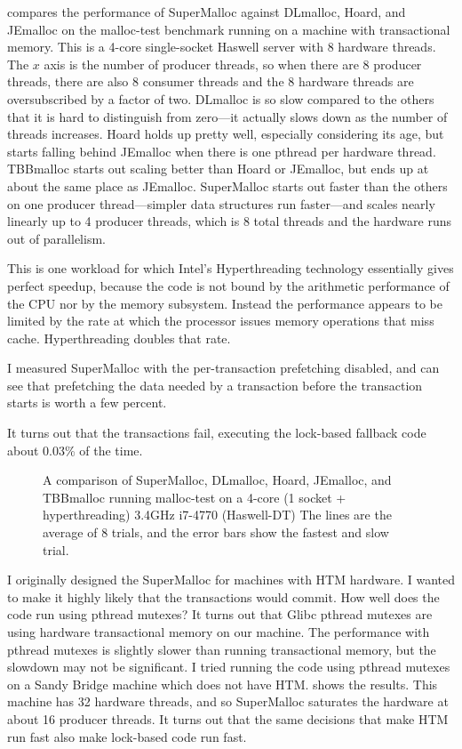 \documentclass[natbib,sort&compress,10pt]{sigplanconf}
\begin{document}
 compares the performance of SuperMalloc against
DLmalloc, Hoard, and JEmalloc on the malloc-test benchmark running on
a machine with transactional memory.  This is a 4-core single-socket
Haswell server with 8 hardware threads.  The $x$ axis is the number of
producer threads, so when there are $8$ producer threads, there are
also $8$ consumer threads and the 8 hardware threads are
oversubscribed by a factor of two.  DLmalloc is so slow compared to
the others that it is hard to distinguish from zero---it actually
slows down as the number of threads increases.  Hoard holds up pretty
well, especially considering its age, but starts falling behind
JEmalloc when there is one pthread per hardware thread.  TBBmalloc
starts out scaling better than Hoard or JEmalloc, but ends up at about
the same place as JEmalloc.  SuperMalloc starts out faster than the
others on one producer thread---simpler data structures run
faster---and scales nearly linearly up to 4 producer threads, which is
8 total threads and the hardware runs out of parallelism.

This is one workload for which Intel's Hyperthreading technology
essentially gives perfect speedup, because the code is not bound by
the arithmetic performance of the CPU nor by the memory subsystem.
Instead the performance appears to be limited by the rate at which the
processor issues memory operations that miss cache.  Hyperthreading
doubles that rate.

I measured SuperMalloc with the per-transaction prefetching disabled,
and can see that prefetching the data needed by a transaction before
the transaction starts is worth a few percent.

It turns out that the transactions fail, executing the lock-based
fallback code about $0.03$\% of the time.

\begin{figure}

\caption{A comparison of SuperMalloc, DLmalloc, Hoard,
  JEmalloc, and TBBmalloc running malloc-test
  on a 4-core (1 socket + hyperthreading) 3.4GHz i7-4770 (Haswell-DT)
  The lines are the average of 8 trials, and the error bars
  show the fastest and slow trial.}
\label{fig:datahtm}
\vspace*{-3ex}
\end{figure}

I originally designed the SuperMalloc for machines with HTM hardware.
I wanted to make it highly likely that the transactions would commit.
How well does the code run using pthread mutexes?  It turns out that
Glibc pthread mutexes are using hardware transactional memory on our
machine.  The performance with pthread mutexes is slightly slower than
running transactional memory, but the slowdown may not be significant.
I tried running the code using pthread mutexes on a Sandy Bridge
machine which does not have HTM\@.   shows the
results. This machine has 32 hardware threads, and so SuperMalloc
saturates the hardware at about 16 producer threads.  It turns out
that the same decisions that make HTM run fast also make lock-based
code run fast.
\end{document}
